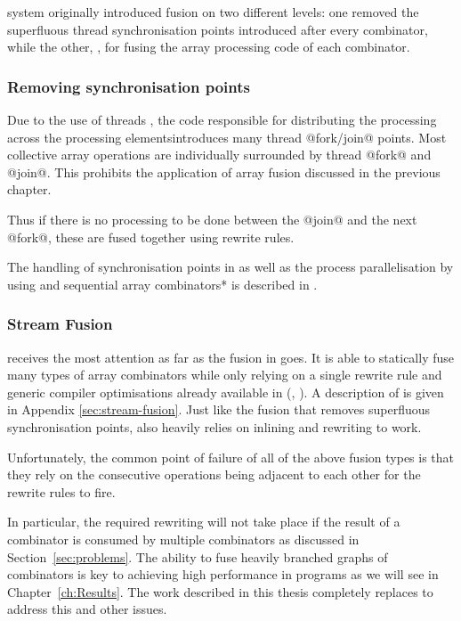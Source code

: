 \documentclass[preamble.tex]{subfiles}
\begin{document}
\DPH system originally introduced fusion on two different levels: one removed the superfluous thread synchronisation points introduced after every combinator, while the other, , for fusing the array processing code of each combinator.


\subsubsection{Removing synchronisation points}

Due to the use of \Haskell threads \cite{Jones08atutorial}, the code responsible for distributing the processing across the processing elements\ipe introduces many thread @fork/join@ points. Most collective array operations are individually surrounded by thread @fork@ and @join@. This prohibits the application of array fusion discussed in the previous chapter.

Thus if there is no processing to be done between the @join@ and the next @fork@, these are fused together using rewrite rules\irwrules \cite{PTH01}.

The handling of synchronisation points in \DPH as well as the process parallelisation by using  and \*sequential array combinators* is described in \cite{CLP+07}.


\subsubsection{Stream Fusion}

\isf receives the most attention as far as the fusion in \DPH goes. It is able to statically fuse many types of array combinators while only relying on a single rewrite rule and generic compiler optimisations already available in \GHC (\cite{GHCOptimiser}, \cite{SpecConstr}). A description of  is given in Appendix \ref{sec:stream-fusion}. Just like the fusion that removes superfluous synchronisation points,  also heavily relies on inlining \cite{PM02} and rewriting \cite{PTH01} to work.

Unfortunately, the common point of failure of all of the above fusion types is that they rely on the consecutive operations being adjacent to each other for the rewrite rules to fire.

In particular, the required rewriting will not take place if the result of a combinator is consumed by multiple combinators as discussed in Section~\ref{sec:problems}. The ability to fuse heavily branched graphs of combinators is key to achieving high performance in \DPH programs as we will see in Chapter~\ref{ch:Results}. The work described in this thesis completely replaces \StreamFusion to address this and other issues.
\end{document}
